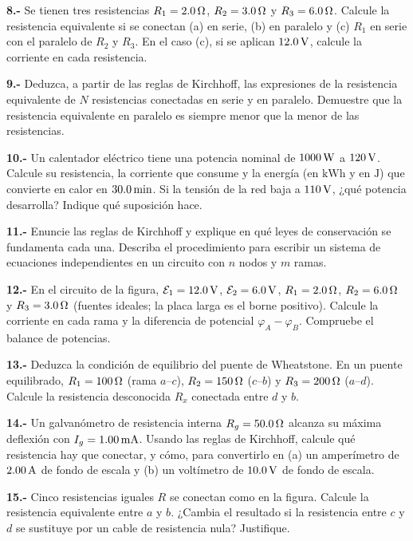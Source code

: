 \documentclass[11pt]{article}
\newcommand{\grupo}[1]{\par\medskip{\color{azul}\bfseries Grupo #1}\par\smallskip}
\newcommand{\p}[1]{\par\smallskip\textbf{#1.-} }
\begin{document}
\p{8} Se tienen tres resistencias $R_1=2.0\ohm$, $R_2=3.0\ohm$ y $R_3=6.0\ohm$. Calcule la resistencia equivalente si se conectan (a) en serie, (b) en paralelo y (c) $R_1$ en serie con el paralelo de $R_2$ y $R_3$. En el caso (c), si se aplican $12.0\uu{V}$, calcule la corriente en cada resistencia.

\p{9} Deduzca, a partir de las reglas de Kirchhoff, las expresiones de la resistencia equivalente de $N$ resistencias conectadas en serie y en paralelo. Demuestre que la resistencia equivalente en paralelo es siempre menor que la menor de las resistencias.

\p{10} Un calentador eléctrico tiene una potencia nominal de $1000\uu{W}$ a $120\uu{V}$. Calcule su resistencia, la corriente que consume y la energía (en $\mathrm{kWh}$ y en $\mathrm{J}$) que convierte en calor en $30.0\uu{min}$. Si la tensión de la red baja a $110\uu{V}$, ¿qué potencia desarrolla? Indique qué suposición hace.

\grupo{III}
\p{11} Enuncie las reglas de Kirchhoff y explique en qué leyes de conservación se fundamenta cada una. Describa el procedimiento para escribir un sistema de ecuaciones independientes en un circuito con $n$ nodos y $m$ ramas.

\p{12} En el circuito de la figura, $\fem_1=12.0\uu{V}$, $\fem_2=6.0\uu{V}$, $R_1=2.0\ohm$, $R_2=6.0\ohm$ y $R_3=3.0\ohm$ (fuentes ideales; la placa larga es el borne positivo). Calcule la corriente en cada rama y la diferencia de potencial $\varphi_A-\varphi_B$. Compruebe el balance de potencias.
\begin{center}\circSunoQdoce\end{center}

\p{13} Deduzca la condición de equilibrio del puente de Wheatstone. En un puente equilibrado, $R_1=100\ohm$ (rama $a$--$c$), $R_2=150\ohm$ ($c$--$b$) y $R_3=200\ohm$ ($a$--$d$). Calcule la resistencia desconocida $R_x$ conectada entre $d$ y $b$.

\p{14} Un galvanómetro de resistencia interna $R_g=50.0\ohm$ alcanza su máxima deflexión con $I_g=1.00\uu{mA}$. Usando las reglas de Kirchhoff, calcule qué resistencia hay que conectar, y cómo, para convertirlo en (a) un amperímetro de $2.00\uu{A}$ de fondo de escala y (b) un voltímetro de $10.0\uu{V}$ de fondo de escala.

\p{15} Cinco resistencias iguales $R$ se conectan como en la figura. Calcule la resistencia equivalente entre $a$ y $b$. ¿Cambia el resultado si la resistencia entre $c$ y $d$ se sustituye por un cable de resistencia nula? Justifique.
\begin{center}\end{center}
\end{document}
